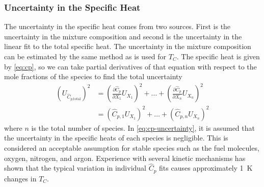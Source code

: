 \documentclass[../main.tex]{subfiles}
\begin{document}
\subsubsection{Uncertainty in the Specific Heat}
\label{sec:unc-cp}

The uncertainty in the specific heat comes from two sources. First is the
uncertainty in the mixture composition and second is the uncertainty in
the linear fit to the total specific heat. The uncertainty in the mixture
composition can be estimated by the same method as is used for $T_C$. The
specific heat is given by \cref{eq:cp}, so we can take partial derivatives
of that equation with respect to the mole fractions of the species to find
the total uncertainty
%
\begin{equation}
\label{eq:cp-uncertainty}
\begin{split}
\left(U_{\hat{C}_{p\text{,total}}}\right)^2 &= \left(\frac{\partial \hat{C}_p}{\partial X_1} U_{X_1}\right)^2 + \ldots + \left(\frac{\partial \hat{C}_p}{\partial X_n} U_{X_n}\right)^2 \\
&= \left(\hat{C}_{p,1} U_{X_1}\right)^2 + \ldots + \left(\hat{C}_{p,n} U_{X_n}\right)^2
\end{split}
\end{equation}
%
where $n$ is the total number of species. In \cref{eq:cp-uncertainty},
it is assumed that the uncertainty in the specific heats of each species
is negligible. This is considered an acceptable assumption for stable species
such as the fuel molecules, oxygen, nitrogen, and argon. Experience with
several kinetic mechanisms has shown that the typical variation in individual
$\hat{C}_p$ fits causes approximately \SI{1}{\kelvin} changes in $T_C$.
\end{document}
